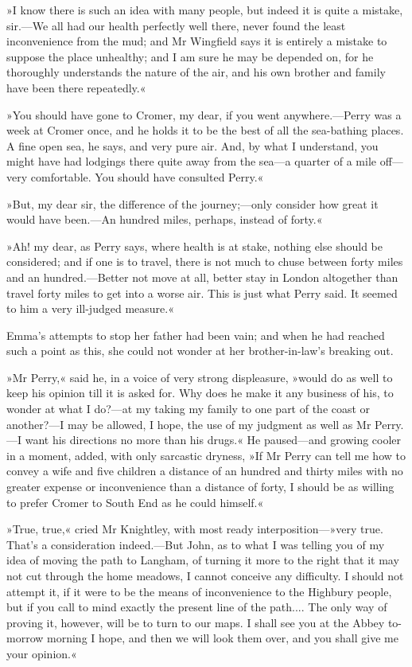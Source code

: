 »I know there is such an idea with many people, but indeed it is quite a mistake, sir.—We all had our health perfectly well there, never found the least inconvenience from the mud; and Mr Wingfield says it is entirely a mistake to suppose the place unhealthy; and I am sure he may be depended on, for he thoroughly understands the nature of the air, and his own brother and family have been there repeatedly.«

»You should have gone to Cromer, my dear, if you went anywhere.—Perry was a week at Cromer once, and he holds it to be the best of all the sea-bathing places. A fine open sea, he says, and very pure air. And, by what I understand, you might have had lodgings there quite away from the sea—a quarter of a mile off—very comfortable. You should have consulted Perry.«

»But, my dear sir, the difference of the journey;—only consider how great it would have been.—An hundred miles, perhaps, instead of forty.«

»Ah! my dear, as Perry says, where health is at stake, nothing else should be considered; and if one is to travel, there is not much to chuse between forty miles and an hundred.—Better not move at all, better stay in London altogether than travel forty miles to get into a worse air. This is just what Perry said. It seemed to him a very ill-judged measure.«

Emma's attempts to stop her father had been vain; and when he had reached such a point as this, she could not wonder at her brother-in-law's breaking out.

»Mr Perry,« said he, in a voice of very strong displeasure, »would do as well to keep his opinion till it is asked for. Why does he make it any business of his, to wonder at what I do?—at my taking my family to one part of the coast or another?—I may be allowed, I hope, the use of my judgment as well as Mr Perry.—I want his directions no more than his drugs.« He paused—and growing cooler in a moment, added, with only sarcastic dryness, »If Mr Perry can tell me how to convey a wife and five children a distance of an hundred and thirty miles with no greater expense or inconvenience than a distance of forty, I should be as willing to prefer Cromer to South End as he could himself.«

»True, true,« cried Mr Knightley, with most ready interposition—»very true. That's a consideration indeed.—But John, as to what I was telling you of my idea of moving the path to Langham, of turning it more to the right that it may not cut through the home meadows, I cannot conceive any difficulty. I should not attempt it, if it were to be the means of inconvenience to the Highbury people, but if you call to mind exactly the present line of the path.... The only way of proving it, however, will be to turn to our maps. I shall see you at the Abbey to-morrow morning I hope, and then we will look them over, and you shall give me your opinion.«

